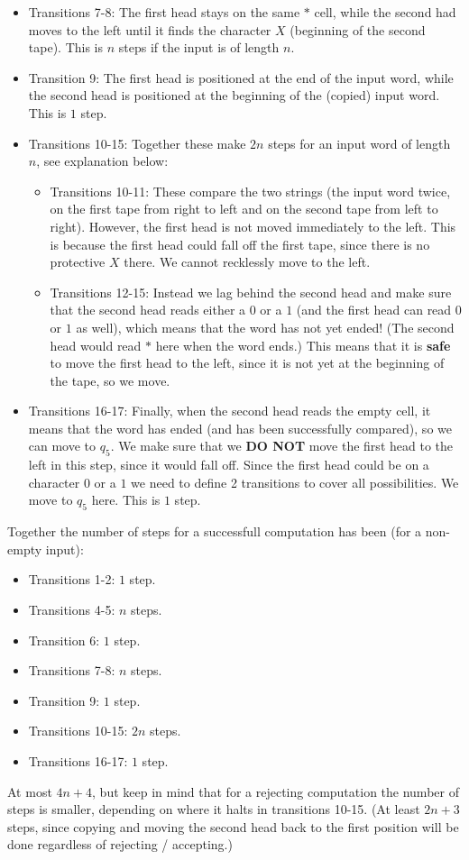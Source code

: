 \begin{itemize}
    \item Transitions 7-8: The first head stays on the same $*$ cell, while the second had moves to the left until it finds the character $X$ (beginning of the second tape). This is $n$ steps if the input is of length $n$.
    \item Transition 9: The first head is positioned at the end of the input word, while the second head is positioned at the beginning of the (copied) input word. This is $1$ step.
    \item Transitions 10-15: Together these make $2n$ steps for an input word of length $n$, see explanation below:
    \begin{itemize}
        \item Transitions 10-11: These compare the two strings (the input word twice, on the first tape from right to left and on the second tape from left to right). However, the first head is not moved immediately to the left. This is because the first head could fall off the first tape, since there is no protective $X$ there. We cannot recklessly move to the left.
        \item Transitions 12-15: Instead we lag behind the second head and make sure that the second head reads either a $0$ or a $1$ (and the first head can read $0$ or $1$ as well), which means that the word has not yet ended! (The second head would read $*$ here when the word ends.) This means that it is \textbf{safe} to move the first head to the left, since it is not yet at the beginning of the tape, so we move.
    \end{itemize}
    \item Transitions 16-17: Finally, when the second head reads the empty cell, it means that the word has ended (and has been successfully compared), so we can move to $q_5$. We make sure that we \textbf{DO NOT} move the first head to the left in this step, since it would fall off. Since the first head could be on a character $0$ or a $1$ we need to define 2 transitions to cover all possibilities. We move to $q_5$ here. This is $1$ step.
\end{itemize}

Together the number of steps for a successfull computation has been (for a non-empty input):

\begin{itemize}
    \item Transitions 1-2: $1$ step.
    \item Transitions 4-5: $n$ steps.
    \item Transition 6: $1$ step.
    \item Transitions 7-8: $n$ steps.
    \item Transition 9: $1$ step.
    \item Transitions 10-15: $2n$ steps.
    \item Transitions 16-17: $1$ step.
\end{itemize}

At most $4n+4$, but keep in mind that for a rejecting computation the number of steps is smaller, depending on where it halts in transitions 10-15. (At least $2n+3$ steps, since copying and moving the second head back to the first position will be done regardless of rejecting / accepting.)